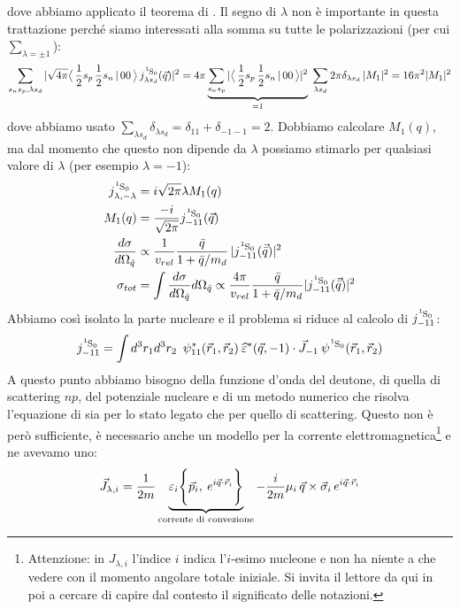 dove abbiamo applicato il teorema di \WE{}. Il segno di $\lambda$ non è importante in questa trattazione perché siamo interessati alla somma su tutte le polarizzazioni (per cui $\sum_{\lambda=\pm 1}$):
$$\sum_{s_ns_p,\lambda s_d}|\sqrt{4\pi} \clebs{\frac{1}{2}s_p\,\frac{1}{2}s_n}{00}\, j^{\ce{^1S_0}}_{\lambda s_d} (\vec{q})|^2 = 4\pi \underbrace{\sum_{s_ns_p}|\clebs{\frac{1}{2}s_p\,\frac{1}{2}s_n}{00}|^2}_{=1} \; \sum_{\lambda s_d} 2\pi \delta_{\lambda s_d}\,|M_1|^2 = 16\pi^2 |M_1|^2$$
dove abbiamo usato $\sum_{\lambda s_d}\delta_{\lambda s_d}=\delta_{11} + \delta_{-1-1} =2$. Dobbiamo calcolare $M_1(q)$, ma dal momento che questo non dipende da $\lambda$ possiamo stimarlo per qualsiasi valore di $\lambda$ (per esempio $\lambda = -1$):
\begin{displaymath}
\begin{aligned}
j^{\ce{^1S_0}}_{\lambda,-\lambda} &= i \sqrt{2\pi} \lambda M_1(q)\\
M_1(q) &= \frac{-i}{\sqrt{2\pi}} j^{\ce{^1S_0}}_{-11} (\vec{q}) \\
\frac{d\sigma}{d\Omega_{\hat{q}}} &\propto \frac{1}{v_{rel}} \frac{\bar{q}}{1+\bar{q}/m_d} \, |j^{\ce{^1S_0}}_{-11}(\vec{\bar{q}})|^2 \\
\sigma_{tot} &= \int \frac{d\sigma}{d\Omega_{\hat{q}}} d\Omega_{\hat{q}} \propto \frac{4\pi}{v_{rel}} \frac{\bar{q}}{1+\bar{q}/m_d} |j^{\ce{^1S_0}}_{-11}(\vec{\bar{q}})|^2
\end{aligned}
\end{displaymath}
Abbiamo così isolato la parte nucleare e il problema si riduce al calcolo di $j^{\ce{^1S_0}}_{-11}$:
$$j^{\ce{^1S_0}}_{-11} = \int d^3r_1 d^3r_2 \;\: \psi_{11}^*(\vec{r}_1,\vec{r}_2)\: \widehat{\varepsilon}^*(\vec{q},-1) \cdot\vec{J}_{-1}\:\psi^{\ce{^1S_0}}(\vec{r}_1,\vec{r}_2)$$
A questo punto abbiamo bisogno della funzione d'onda del deutone, di quella di scattering $np$, del potenziale nucleare e di un metodo numerico che risolva l'equazione di \Sch{} sia per lo stato legato che per quello di scattering. Questo non è però sufficiente, è necessario anche un modello per la corrente elettromagnetica\footnote{Attenzione: in $J_{\lambda,i}$ l'indice $i$ indica l'$i$-esimo nucleone e non ha niente a che vedere con il momento angolare totale iniziale. Si invita il lettore da qui in poi a cercare di capire dal contesto il significato delle notazioni.} e ne avevamo uno:
$$\vec{J}_{\lambda,i} = \frac{1}{2m} \underbrace{\varepsilon_i \Biggl \{ \vec{p}_i,\:e^{i\vec{q}\cdot\vec{r}_i} \Biggr \}}_\text{corrente di convezione} - \frac{i}{2m} \mu_i \, \vec{q}\times \vec{\sigma}_i\, e^{i\vec{q}\cdot\vec{r}_i}$$
